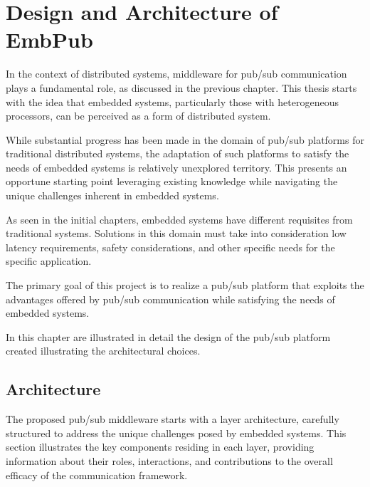 

\chapter{Design and Architecture of EmbPub}

In the context of distributed systems, middleware for pub/sub communication
plays a fundamental role, as discussed in the previous chapter. This thesis
starts with the idea that embedded systems, particularly those with
heterogeneous processors, can be perceived as a form of distributed system.

While substantial progress has been made in the domain of pub/sub platforms for
traditional distributed systems, the adaptation of such platforms to satisfy
the needs of embedded systems is relatively unexplored territory.
This presents an opportune starting point leveraging existing knowledge while
navigating the unique challenges inherent in embedded systems.

As seen in the initial chapters, embedded systems have different requisites
from traditional systems.
Solutions in this domain must take into consideration low latency requirements,
safety considerations, and other specific needs for the specific application.

The primary goal of this project is to realize a pub/sub platform that exploits
the advantages offered by pub/sub communication while satisfying the needs of
embedded systems.

In this chapter are illustrated in detail the design of the pub/sub
platform created illustrating the architectural choices.

\section{Architecture}

The proposed pub/sub middleware starts with a layer architecture, carefully
structured to address the unique challenges posed by embedded systems. This
section illustrates the key components residing in each layer, providing
information about their roles, interactions, and contributions to the overall
efficacy of the communication framework.

